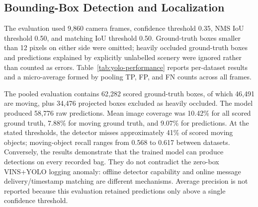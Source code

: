 \subsection{Bounding-Box Detection and Localization}
\label{sec:yolo-bbox}

The evaluation used 9,860 camera frames, confidence threshold 0.35, NMS IoU
threshold 0.50, and matching IoU threshold 0.50. Ground-truth
boxes smaller than 12 pixels on either side were omitted; heavily occluded
ground-truth boxes and predictions explained by explicitly unlabelled scenery
were ignored rather than counted as errors. Table~\ref{tab:yolo-performance}
reports per-dataset results and a micro-average formed by pooling TP, FP, and FN
counts across all frames.

\begin{table}[htbp]
\centering
\caption{Offline YOLO performance against projected Gazebo object ground truth.
This is a detector-capability measurement, not an evaluation of delivery to the
online SLAM filters.}
\label{tab:yolo-performance}
\end{table}

The pooled evaluation contains 62,282 scored ground-truth boxes, of which 46,491
are moving, plus 34,476 projected boxes excluded as heavily occluded. The model
produced 58,776 raw predictions. Mean image coverage was 10.42\% for all scored
ground truth, 7.88\% for moving ground truth, and 9.07\% for predictions. At the
stated thresholds, the detector misses approximately 41\% of scored moving
objects; moving-object recall ranges from 0.568 to 0.617 between datasets.
Conversely, the results demonstrate that the trained model can produce detections
on every recorded bag. They do not contradict the zero-box VINS+YOLO logging
anomaly: offline detector capability and online message delivery/timestamp
matching are different mechanisms. Average precision is not reported because
this evaluation retained predictions only above a single confidence threshold.

